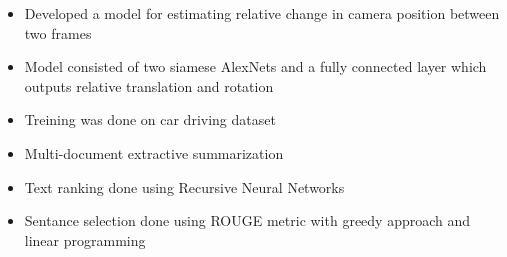\documentclass[10pt,a4paper]{altacv}
\begin{document}


\medskip



\begin{itemize}
    \item \small{Developed a model for estimating relative change in camera position between two frames}
    \item \small{Model consisted of two siamese AlexNets and a fully connected layer which outputs relative translation and rotation}
    \item \small{Treining was done on car driving dataset}
    \\
    \smallskip
      
\end{itemize}
    
\divider


\begin{itemize}
  \item \small{Multi-document extractive summarization}
  \item \small{Text ranking done using Recursive Neural Networks}
  \item \small{Sentance selection done using ROUGE metric with greedy approach and linear programming}
  \\
  \smallskip
    
\end{itemize}

\divider

%
\end{document}
